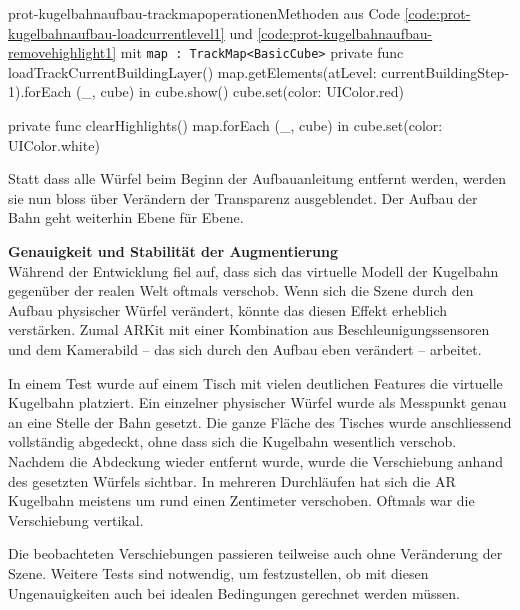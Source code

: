 \begin{description}
	\begin{code}{prot-kugelbahnaufbau-trackmapoperationen}{Methoden aus Code \ref{code:prot-kugelbahnaufbau-loadcurrentlevel1} und \ref{code:prot-kugelbahnaufbau-removehighlight1} mit \texttt{map : TrackMap<BasicCube>}}
		private func loadTrackCurrentBuildingLayer() {
			map.getElements(atLevel: currentBuildingStep-1).forEach { (_, cube) in
				cube.show()
				cube.set(color: UIColor.red)
			}
		}

		private func clearHighlights() {
			map.forEach { (_, cube) in
				cube.set(color: UIColor.white)
			}
		}
	\end{code}

	Statt dass alle Würfel beim Beginn der Aufbauanleitung entfernt werden, werden sie nun bloss über Verändern der Transparenz ausgeblendet. Der Aufbau der Bahn geht weiterhin Ebene für Ebene.

	\textbf{Genauigkeit und Stabilität der Augmentierung}\\
	Während der Entwicklung fiel auf, dass sich das virtuelle Modell der Kugelbahn gegenüber der realen Welt oftmals verschob. Wenn sich die Szene durch den Aufbau physischer Würfel verändert, könnte das diesen Effekt erheblich verstärken. Zumal ARKit mit einer Kombination aus Beschleunigungssensoren und dem Kamerabild – das sich durch den Aufbau eben verändert – arbeitet.

	In einem Test wurde auf einem Tisch mit vielen deutlichen Features die virtuelle Kugelbahn platziert. Ein einzelner physischer Würfel wurde als Messpunkt genau an eine Stelle der Bahn gesetzt. Die ganze Fläche des Tisches wurde anschliessend vollständig abgedeckt, ohne dass sich die Kugelbahn wesentlich verschob. Nachdem die Abdeckung wieder entfernt wurde, wurde die Verschiebung anhand des gesetzten Würfels sichtbar. In mehreren Durchläufen hat sich die AR Kugelbahn meistens um rund einen Zentimeter verschoben. Oftmals war die Verschiebung vertikal.

	Die beobachteten Verschiebungen passieren teilweise auch ohne Veränderung der Szene. Weitere Tests sind notwendig, um festzustellen, ob mit diesen Ungenauigkeiten auch bei idealen Bedingungen gerechnet werden müssen.



\end{description}


